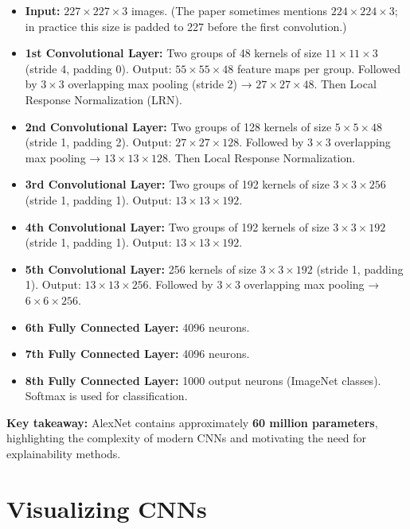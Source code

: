 \documentclass{article}
\begin{document}
\begin{itemize}
    \item \textbf{Input:} $227\times227\times3$ images.  
    (The paper sometimes mentions $224\times224\times3$; in practice this size is padded to 227 before the first convolution.)

    \item \textbf{1st Convolutional Layer:} Two groups of 48 kernels of size $11\times11\times3$ (stride 4, padding 0).  
    Output: $55\times55\times48$ feature maps per group.  
    Followed by $3\times3$ overlapping max pooling (stride 2) → $27\times27\times48$.  
    Then Local Response Normalization (LRN).

    \item \textbf{2nd Convolutional Layer:} Two groups of 128 kernels of size $5\times5\times48$ (stride 1, padding 2).  
    Output: $27\times27\times128$.  
    Followed by $3\times3$ overlapping max pooling → $13\times13\times128$.  
    Then Local Response Normalization.

    \item \textbf{3rd Convolutional Layer:} Two groups of 192 kernels of size $3\times3\times256$ (stride 1, padding 1).  
    Output: $13\times13\times192$.

    \item \textbf{4th Convolutional Layer:} Two groups of 192 kernels of size $3\times3\times192$ (stride 1, padding 1).  
    Output: $13\times13\times192$.

    \item \textbf{5th Convolutional Layer:} 256 kernels of size $3\times3\times192$ (stride 1, padding 1).  
    Output: $13\times13\times256$.  
    Followed by $3\times3$ overlapping max pooling → $6\times6\times256$.

    \item \textbf{6th Fully Connected Layer:} 4096 neurons.
    \item \textbf{7th Fully Connected Layer:} 4096 neurons.
    \item \textbf{8th Fully Connected Layer:} 1000 output neurons (ImageNet classes).  
    Softmax is used for classification.
\end{itemize}

\textbf{Key takeaway:} AlexNet contains approximately \textbf{60 million parameters}, 
highlighting the complexity of modern CNNs and motivating the need for explainability methods.

\section{Visualizing CNNs}
\end{document}
